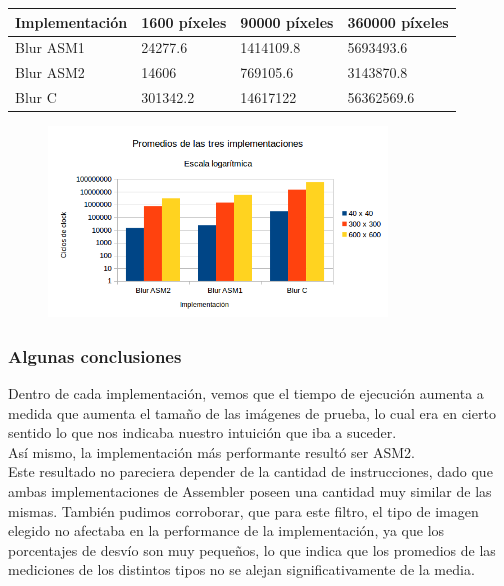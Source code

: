 \begin{tabular}{| l | l | l | l|}
\hline
Implementación  & 1600 píxeles & 90000 píxeles & 360000 píxeles\\
\hline
Blur ASM1  & 24277.6 & 1414109.8 & 5693493.6\\
\hline
Blur ASM2  &  14606 & 769105.6 & 3143870.8\\
\hline
Blur C & 301342.2 & 14617122 & 56362569.6\\
\hline
\end{tabular}

\begin{figure}[ht]
\centering
\includegraphics[width=90mm]{blur/graficoBlur_cte.png}
\end{figure}

\subsubsection{Algunas conclusiones}
Dentro de cada implementación, vemos que el tiempo de ejecución aumenta a medida que aumenta el tamaño de las imágenes de prueba, lo cual era en cierto sentido lo que nos indicaba nuestro intuición que iba a suceder.\\
Así mismo, la implementación más performante resultó ser ASM2.\\
Este resultado no pareciera depender de la cantidad de instrucciones, dado que ambas implementaciones de Assembler poseen una cantidad muy similar de las mismas. 
También pudimos corroborar, que para este filtro, el tipo de imagen elegido no afectaba en la performance de la implementación, ya que los porcentajes de desvío son muy pequeños, lo que indica que los promedios de las mediciones de los distintos tipos no se alejan significativamente de la media.\\


